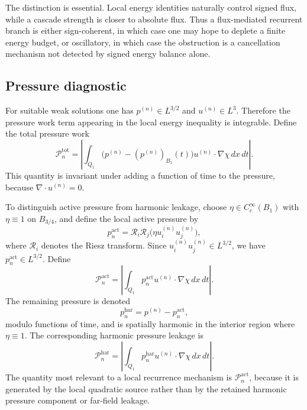 \documentclass[11pt]{article}
\numberwithin{equation}{section}
\theoremstyle{plain}
\theoremstyle{definition}
\theoremstyle{remark}
\newcommand{\har}{\mathrm{har}}
\newcommand{\Press}{\mathcal P}
\newcommand{\act}{\mathrm{act}}
\newcommand{\tot}{\mathrm{tot}}
\begin{document}
The distinction is essential.  Local energy identities naturally control signed flux, while a cascade strength is closer to absolute flux.  Thus a flux-mediated recurrent branch is either sign-coherent, in which case one may hope to deplete a finite energy budget, or oscillatory, in which case the obstruction is a cancellation mechanism not detected by signed energy balance alone.

\subsection{Pressure diagnostic}

For suitable weak solutions one has \(p^{(n)}\in L^{3/2}\) and \(u^{(n)}\in L^3\).  Therefore the pressure work term appearing in the local energy inequality is integrable.  Define the total pressure work
\begin{equation}
    \Press^{\tot}_{n}
    =
    \left|
    \int_{Q_1}
    \bigl(p^{(n)}-(p^{(n)})_{B_1}(t)\bigr)
    u^{(n)}\cdot\nabla\chi\,dx\,dt
    \right|.
\end{equation}
This quantity is invariant under adding a function of time to the pressure, because \(\nabla\cdot u^{(n)}=0\).

To distinguish active pressure from harmonic leakage, choose \(\eta\in C_c^\infty(B_1)\) with \(\eta\equiv1\) on \(B_{3/4}\), and define the local active pressure by
\begin{equation}
    p^{\act}_n
    =
    \mathcal R_i\mathcal R_j
    \bigl(\eta u^{(n)}_i u^{(n)}_j\bigr),
\end{equation}
where \(\mathcal R_i\) denotes the Riesz transform.  Since \(u^{(n)}_i u^{(n)}_j\in L^{3/2}\), we have \(p^{\act}_n\in L^{3/2}\).  Define
\begin{equation}
    \Press^{\act}_{n}
    =
    \left|
    \int_{Q_1}
    p^{\act}_n u^{(n)}\cdot\nabla\chi\,dx\,dt
    \right|.
\end{equation}
The remaining pressure is denoted
\[
    p^{\har}_n=p^{(n)}-p^{\act}_n,
\]
modulo functions of time, and is spatially harmonic in the interior region where \(\eta\equiv1\).  The corresponding harmonic pressure leakage is
\begin{equation}
    \Press^{\har}_{n}
    =
    \left|
    \int_{Q_1}
    p^{\har}_n u^{(n)}\cdot\nabla\chi\,dx\,dt
    \right|.
\end{equation}
The quantity most relevant to a local recurrence mechanism is \(\Press^{\act}_n\), because it is generated by the local quadratic source rather than by the retained harmonic pressure component or far-field leakage.
\end{document}
